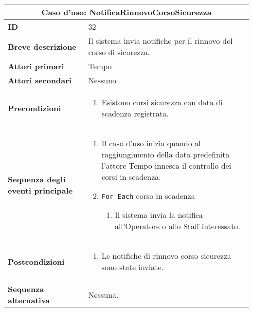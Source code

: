 \documentclass[a4paper]{report}
\begin{document}
\clearpage
\begin{table}[H]
\vspace*{-0cm}
\renewcommand{\arraystretch}{1.9}
\begin{tabular}{|p{3.9cm}|p{9.9cm}|}
\hline
\multicolumn{2}{|c|}{\textbf{Caso d’uso: NotificaRinnovoCorsoSicurezza}} \\ \hline
	\textbf{ID} & 32 \\ \hline
	\textbf{Breve descrizione} & Il sistema invia notifiche per il rinnovo del corso di sicurezza. \\ \hline
	\textbf{Attori primari} & Tempo \\ \hline
	\textbf{Attori secondari} & Nessuno \\ \hline
	\textbf{Precondizioni} & \begin{enumerate}[leftmargin=14pt,label=\arabic*.,labelsep=0.5em,topsep=0pt,partopsep=0pt,parsep=0pt,itemsep=0pt]
        \item Esistono corsi sicurezza con data di scadenza registrata.
    \end{enumerate} \\ \hline
	\textbf{Sequenza degli eventi principale} & 
\begin{enumerate}[leftmargin=14pt,label=\arabic*.,labelsep=0.5em,topsep=0pt,partopsep=0pt,parsep=0pt,itemsep=0pt]
    \item Il caso d’uso inizia quando al raggiungimento della data predefinita l’attore Tempo innesca il controllo dei corsi in scadenza.
    \item \texttt{For Each} corso in scadenza
    \begin{enumerate}[label=\arabic{enumi}.\arabic*.,leftmargin=22pt,labelsep=0.5em,topsep=0pt,partopsep=0pt,parsep=0pt,itemsep=0pt]
        \item Il sistema invia la notifica all’Operatore o allo Staff interessato.
    \end{enumerate}
\end{enumerate}\\ \hline
	\textbf{Postcondizioni} &
    \begin{enumerate}[label=\arabic*.,leftmargin=14pt,labelsep=0.5em,topsep=0pt,partopsep=0pt,parsep=0pt,itemsep=0pt]
        \item Le notifiche di rinnovo corso sicurezza sono state inviate.
    \end{enumerate} \\ \hline
	\textbf{Sequenza alternativa} & Nessuna. \\ \hline
\end{tabular}
\end{table}
\end{document}
